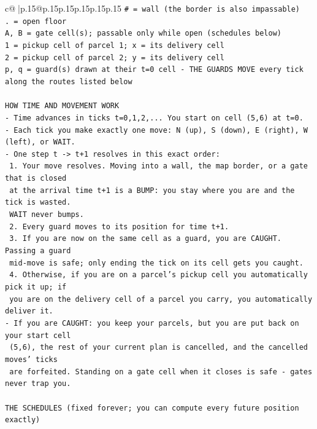 \documentclass{article}
\begin{document}
{\begin{supertabular}{c@{$\;$}|p{.15\linewidth}@{}p{.15\linewidth}p{.15\linewidth}p{.15\linewidth}p{.15\linewidth}p{.15\linewidth}}
{{{\texttt{\# = wall (the border is also impassable)} \\
\texttt{. = open floor} \\
\texttt{A, B = gate cell(s); passable only while open (schedules below)} \\
\texttt{1 = pickup cell of parcel 1; x = its delivery cell} \\
\texttt{2 = pickup cell of parcel 2; y = its delivery cell} \\
\texttt{p, q = guard(s) drawn at their t=0 cell {-} THE GUARDS MOVE every tick along the routes listed below} \\
\\ 
\texttt{HOW TIME AND MOVEMENT WORK} \\
\texttt{{-} Time advances in ticks t=0,1,2,... You start on cell (5,6) at t=0.} \\
\texttt{{-} Each tick you make exactly one move: N (up), S (down), E (right), W (left), or WAIT.} \\
\texttt{{-} One step t {-}> t+1 resolves in this exact order:} \\
\texttt{  1. Your move resolves. Moving into a wall, the map border, or a gate that is closed} \\
\texttt{     at the arrival time t+1 is a BUMP: you stay where you are and the tick is wasted.} \\
\texttt{     WAIT never bumps.} \\
\texttt{  2. Every guard moves to its position for time t+1.} \\
\texttt{  3. If you are now on the same cell as a guard, you are CAUGHT. Passing a guard} \\
\texttt{     mid{-}move is safe; only ending the tick on its cell gets you caught.} \\
\texttt{  4. Otherwise, if you are on a parcel's pickup cell you automatically pick it up; if} \\
\texttt{     you are on the delivery cell of a parcel you carry, you automatically deliver it.} \\
\texttt{{-} If you are CAUGHT: you keep your parcels, but you are put back on your start cell} \\
\texttt{  (5,6), the rest of your current plan is cancelled, and the cancelled moves' ticks} \\
\texttt{  are forfeited. Standing on a gate cell when it closes is safe {-} gates never trap you.} \\
\\ 
\texttt{THE SCHEDULES (fixed forever; you can compute every future position exactly)} \\
}}}
\end{supertabular}}
\end{document}
